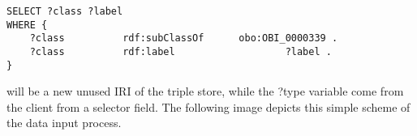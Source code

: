 \begin{lstlisting}[captionpos=b, caption= SPARQL query for the input form, label=skullJSON,
basicstyle=\footnotesize,frame=single]
SELECT ?class ?label
WHERE {
	?class 			rdf:subClassOf	 	obo:OBI_0000339 .  
	?class			rdf:label					?label . 
}
\end{lstlisting}

will be a new unused IRI of the triple store, while the ?type variable come from the client from a selector field. The following image depicts this simple scheme of the data input process. 


